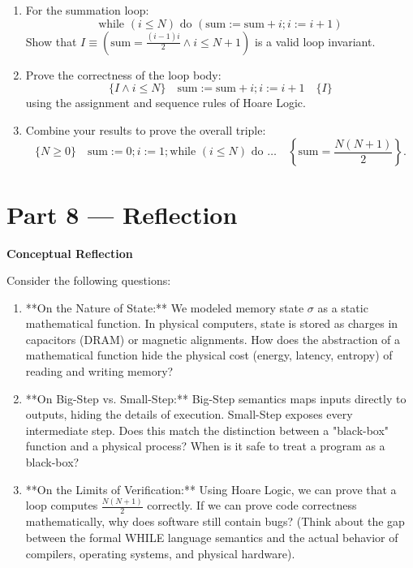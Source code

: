 \documentclass[12pt, a4paper]{book}
\begin{document}
\begin{deepbox}
\begin{enumerate}[label=\textbf{D\arabic*.}]
        \begin{enumerate}[label=(\alph*)]
          \item For the summation loop:
                \[
                  \text{while } (i \le N) \text{ do } (\text{sum} := \text{sum} + i ; i := i + 1)
                \]
                Show that $I \equiv \left( \text{sum} = \frac{(i-1)i}{2} \land i \le N + 1 \right)$ is a valid loop invariant.
          \item Prove the correctness of the loop body:
                \[
                  \{I \land i \le N\} \quad \text{sum} := \text{sum} + i ; i := i + 1 \quad \{I\}
                \]
                using the assignment and sequence rules of Hoare Logic.
          \item Combine your results to prove the overall triple:
                \[
                  \{N \ge 0\} \quad \text{sum} := 0 ; i := 1 ; \text{while } (i \le N) \text{ do } \dots \quad \left\{ \text{sum} = \frac{N(N+1)}{2} \right\}.
                \]
        \end{enumerate}
\end{enumerate}
\end{deepbox}

\newpage

\section{Part 8 --- Reflection}

\begin{reflectionbox}
\textbf{Conceptual Reflection}

Consider the following questions:
\begin{enumerate}
  \item **On the Nature of State:** We modeled memory state $\sigma$ as a static mathematical function. In physical computers, state is stored as charges in capacitors (DRAM) or magnetic alignments. How does the abstraction of a mathematical function hide the physical cost (energy, latency, entropy) of reading and writing memory?
  \item **On Big-Step vs. Small-Step:** Big-Step semantics maps inputs directly to outputs, hiding the details of execution. Small-Step exposes every intermediate step. Does this match the distinction between a "black-box" function and a physical process? When is it safe to treat a program as a black-box?
  \item **On the Limits of Verification:** Using Hoare Logic, we can prove that a loop computes $\frac{N(N+1)}{2}$ correctly. If we can prove code correctness mathematically, why does software still contain bugs? (Think about the gap between the formal WHILE language semantics and the actual behavior of compilers, operating systems, and physical hardware).
\end{enumerate}
\end{reflectionbox}
\end{document}
